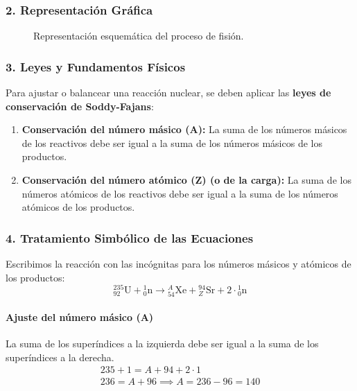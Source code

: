 \subsubsection*{2. Representación Gráfica}
\begin{figure}[H]
    \centering
    \caption{Representación esquemática del proceso de fisión.}
\end{figure}

\subsubsection*{3. Leyes y Fundamentos Físicos}
Para ajustar o balancear una reacción nuclear, se deben aplicar las \textbf{leyes de conservación de Soddy-Fajans}:
\begin{enumerate}
    \item \textbf{Conservación del número másico (A):} La suma de los números másicos de los reactivos debe ser igual a la suma de los números másicos de los productos.
    \item \textbf{Conservación del número atómico (Z) (o de la carga):} La suma de los números atómicos de los reactivos debe ser igual a la suma de los números atómicos de los productos.
\end{enumerate}

\subsubsection*{4. Tratamiento Simbólico de las Ecuaciones}
Escribimos la reacción con las incógnitas para los números másicos y atómicos de los productos:
$$ {}^{235}_{92}\text{U} + {}^{1}_{0}\text{n} \longrightarrow {}^{A}_{54}\text{Xe} + {}^{94}_{Z}\text{Sr} + 2 \cdot {}^{1}_{0}\text{n} $$

\paragraph{Ajuste del número másico (A)}
La suma de los superíndices a la izquierda debe ser igual a la suma de los superíndices a la derecha.
\begin{gather}
    235 + 1 = A + 94 + 2 \cdot 1 \\
    236 = A + 96 \implies A = 236 - 96 = 140
\end{gather}


